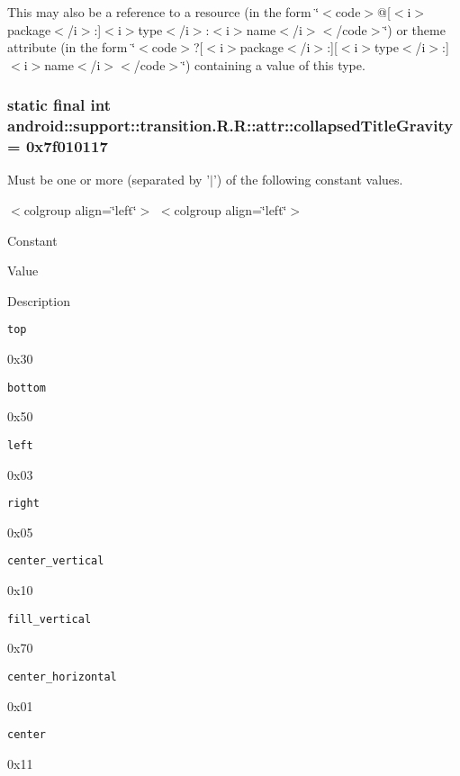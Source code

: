 This may also be a reference to a resource (in the form \char`\"{}$<$code$>$@\mbox{[}$<$i$>$package$<$/i$>$:\mbox{]}$<$i$>$type$<$/i$>$:$<$i$>$name$<$/i$>$$<$/code$>$\char`\"{}) or theme attribute (in the form \char`\"{}$<$code$>$?\mbox{[}$<$i$>$package$<$/i$>$:\mbox{]}\mbox{[}$<$i$>$type$<$/i$>$:\mbox{]}$<$i$>$name$<$/i$>$$<$/code$>$\char`\"{}) containing a value of this type. \hypertarget{classandroid_1_1support_1_1transition_1_1_r_1_1attr_64131cf323422a85f661e0e8b619f9af}{
\subsubsection[{collapsedTitleGravity}]{\setlength{\rightskip}{0pt plus 5cm}static final int android::support::transition.R.R::attr::collapsedTitleGravity = 0x7f010117}}
\label{classandroid_1_1support_1_1transition_1_1_r_1_1attr_64131cf323422a85f661e0e8b619f9af}


Must be one or more (separated by '$|$') of the following constant values. \begin{TabularC}{0}
\hline
\end{TabularC}
$<$colgroup align=\char`\"{}left\char`\"{}$>$ $<$colgroup align=\char`\"{}left\char`\"{}$>$ 

Constant

Value

Description 

{\tt top}

0x30

{\tt bottom}

0x50

{\tt left}

0x03

{\tt right}

0x05

{\tt center\_\-vertical}

0x10

{\tt fill\_\-vertical}

0x70

{\tt center\_\-horizontal}

0x01

{\tt center}

0x11

